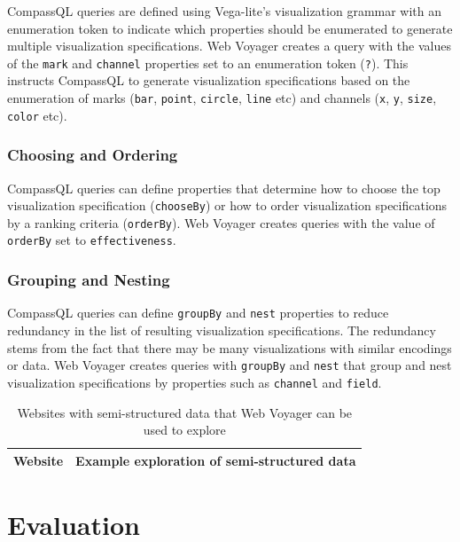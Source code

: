 \documentclass{vgtc}                          %
\begin{document}
CompassQL queries are defined using Vega-lite's visualization grammar
with an enumeration token to indicate which properties should be
enumerated to generate multiple visualization specifications. Web
Voyager creates a query with the values of the \texttt{mark} and
\texttt{channel} properties set to an enumeration token (\texttt{?}).
This instructs CompassQL to generate visualization specifications based
on the enumeration of marks (\texttt{bar}, \texttt{point},
\texttt{circle}, \texttt{line} etc) and channels (\texttt{x},
\texttt{y}, \texttt{size}, \texttt{color} etc).

\subsubsection{Choosing and Ordering}

CompassQL queries can define properties that determine how to choose the
top visualization specification (\texttt{chooseBy}) or how to order
visualization specifications by a ranking criteria (\texttt{orderBy}).
Web Voyager creates queries with the value of \texttt{orderBy} set to
\texttt{effectiveness}.

\subsubsection{Grouping and Nesting}

CompassQL queries can define \texttt{groupBy} and \texttt{nest}
properties to reduce redundancy in the list of resulting visualization
specifications. The redundancy stems from the fact that there may be
many visualizations with similar encodings or data. Web Voyager creates
queries with \texttt{groupBy} and \texttt{nest} that group and nest
visualization specifications by properties such as \texttt{channel} and
\texttt{field}.

\begin{table}[]
\centering
\begin{tabular}{|l|l|}
\hline
\textbf{Website}              & \textbf{Example exploration of semi-structured data}                                        \\ \hline
\end{tabular}
\vspace{8pt}
\caption{Websites with semi-structured data that Web Voyager can be used to explore}
\end{table}

\section{Evaluation} \label{evaluation}
\end{document}
